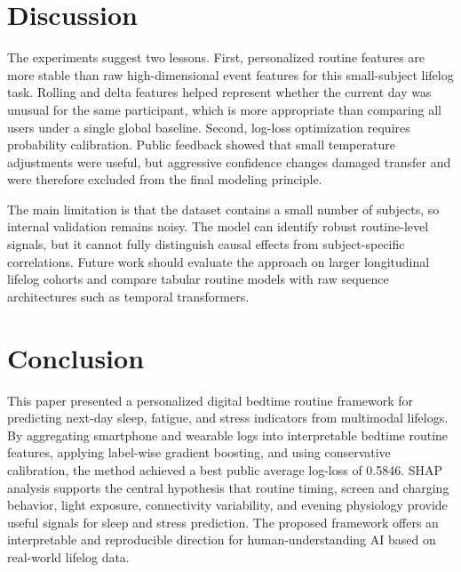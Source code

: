 \documentclass[conference]{IEEEtran}
\begin{document}
\section{Discussion}
The experiments suggest two lessons. First, personalized routine features are more stable than raw high-dimensional event features for this small-subject lifelog task. Rolling and delta features helped represent whether the current day was unusual for the same participant, which is more appropriate than comparing all users under a single global baseline. Second, log-loss optimization requires probability calibration. Public feedback showed that small temperature adjustments were useful, but aggressive confidence changes damaged transfer and were therefore excluded from the final modeling principle.

The main limitation is that the dataset contains a small number of subjects, so internal validation remains noisy. The model can identify robust routine-level signals, but it cannot fully distinguish causal effects from subject-specific correlations. Future work should evaluate the approach on larger longitudinal lifelog cohorts and compare tabular routine models with raw sequence architectures such as temporal transformers.

\section{Conclusion}
This paper presented a personalized digital bedtime routine framework for predicting next-day sleep, fatigue, and stress indicators from multimodal lifelogs. By aggregating smartphone and wearable logs into interpretable bedtime routine features, applying label-wise gradient boosting, and using conservative calibration, the method achieved a best public average log-loss of 0.5846. SHAP analysis supports the central hypothesis that routine timing, screen and charging behavior, light exposure, connectivity variability, and evening physiology provide useful signals for sleep and stress prediction. The proposed framework offers an interpretable and reproducible direction for human-understanding AI based on real-world lifelog data.



\end{document}
